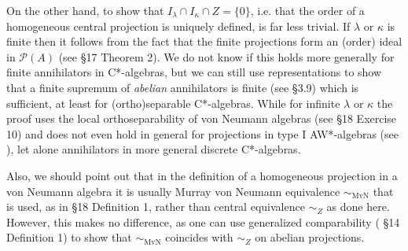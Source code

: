 \documentclass{amsart}
\theoremstyle{definition}
\numberwithin{equation}{section}
\begin{document}
On the other hand, to show that $I_\lambda\cap I_\kappa\cap Z=\{0\}$, i.e. that the order of a homogeneous central projection is uniquely defined, is far less trivial.  If $\lambda$ or $\kappa$ is finite then it follows from the fact that the finite projections form an (order) ideal in $\mathcal{P}(A)$ (see \cite{Berberian1972} \S17 Theorem 2).  We do not know if this holds more generally for finite annihilators in C*-algebras, but we can still use representations to show that a finite supremum of \emph{abelian} annihilators is finite (see \cite{Bice2014} \S3.9) which is sufficient, at least for (ortho)separable C*-algebras.  While for infinite $\lambda$ or $\kappa$ the proof uses the local orthoseparability of von Neumann algebras (see \cite{Berberian1972} \S18 Exercise 10) and does not even hold in general for projections in type I AW*-algebras (see \cite{Ozawa1985}), let alone annihilators in more general discrete C*-algebras.

Also, we should point out that in the definition of a homogeneous projection in a von Neumann algebra it is usually Murray von Neumann equivalence $\sim_\mathrm{MvN}$ that is used, as in \cite{Berberian1972} \S18 Definition 1, rather than central equivalence $\sim_Z$ as done here.  However, this makes no difference, as one can use generalized comparability (\cite{Berberian1972} \S14 Definition 1) to show that $\sim_\mathrm{MvN}$ coincides with $\sim_Z$ on abelian projections. 

\newpage

{}

\end{document}
